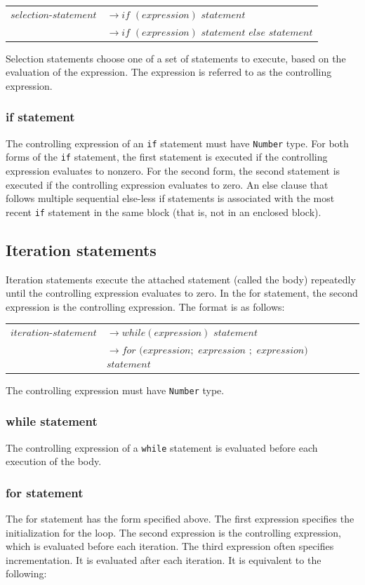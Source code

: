 \documentclass[12pt,A4]{book}
\begin{document}
\begin{tabular}{l l}
$selection\mbox{-}statement$ & $\rightarrow if$ $(expression)$ $statement$\\
& $\rightarrow if$ $(expression)$ $statement$ $else$ $statement$
\end{tabular}

Selection statements choose one of a set of statements to execute, based on the evaluation of the expression.  The expression is referred to as the controlling expression.
\subsubsection{if statement}
The controlling expression of an \verb|if| statement must have \verb|Number| type. For both forms of the \verb|if| statement, the first statement is executed if the controlling expression evaluates to nonzero.  For the second form, the second statement is executed if the controlling expression evaluates to zero.  An else clause that follows multiple sequential else-less if statements is associated with the most recent \verb|if| statement in the same block (that is, not in an enclosed block).
\subsection{Iteration statements}
Iteration statements execute the attached statement (called the body) repeatedly until the controlling expression evaluates to zero.  In the for statement, the second expression is the controlling expression.  The format is as follows:

\begin{tabular}{l l}
$iteration\mbox{-}statement$ & $\rightarrow while(expression)$ $statement$\\
& $\rightarrow for$ $(expression;$ $expression$ $;$ $expression)$ $statement$
\end{tabular}

The controlling expression must have \verb|Number| type.
\subsubsection{while statement}
The controlling expression of a \verb|while| statement is evaluated before each execution of the body.
\subsubsection{for statement}
The for statement has the form specified above.  The first expression specifies the initialization for the loop.  The second expression is the controlling expression, which is evaluated before each iteration.  The third expression often specifies incrementation.  It is evaluated after each iteration. It is equivalent to the following:
\end{document}
